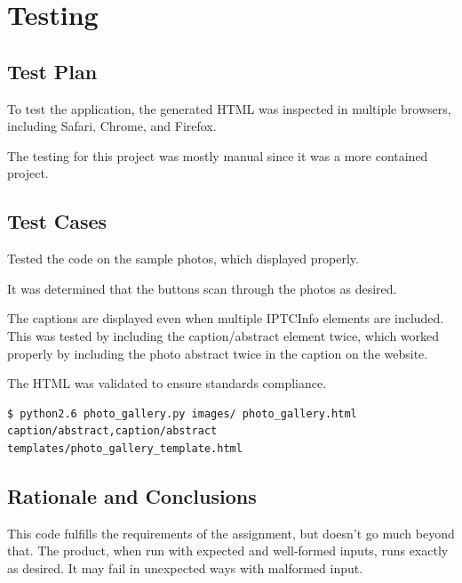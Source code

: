 \documentclass[11pt,letterpaper]{article}
\begin{document}
\section{Testing}

\subsection{Test Plan}
To test the application, the generated HTML was inspected in multiple browsers, including Safari, Chrome, and Firefox.

The testing for this project was mostly manual since it was a more contained project.
\subsection{Test Cases}
Tested the code on the sample photos, which displayed properly.

It was determined that the buttons scan through the photos as desired.

The captions are displayed even when multiple IPTCInfo elements are included. This was tested by including the caption/abstract element twice, which worked properly by including the photo abstract twice in the caption on the website.

The HTML was validated to ensure standards compliance.
\begin{verbatim}
$ python2.6 photo_gallery.py images/ photo_gallery.html caption/abstract,caption/abstract 
templates/photo_gallery_template.html
\end{verbatim}

\subsection{Rationale and Conclusions}
This code fulfills the requirements of the assignment, but doesn't go much beyond that. The product, when run with expected and well-formed inputs, runs exactly as desired. It may fail in unexpected ways with malformed input.
\end{document}
